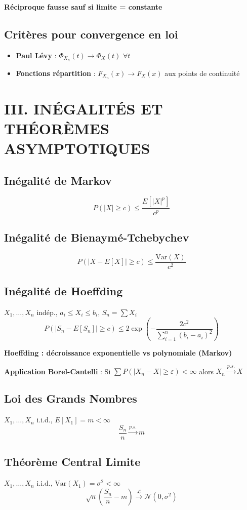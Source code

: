 \documentclass[8pt,twocolumn]{article}
\newcommand{\mydef}[1]{\textcolor{defcolor}{\textbf{#1}}}
\newcommand{\mythm}[1]{\textcolor{thmcolor}{\textbf{#1}}}
\newcommand{\myprop}[1]{\textcolor{propcolor}{\textbf{#1}}}
\newcommand{\myrem}[1]{\textcolor{remcolor}{\textbf{#1}}}
\begin{document}
\myrem{Réciproque fausse sauf si limite = constante}

\subsection{\myprop{Critères pour convergence en loi}}
\begin{itemize}[nosep]
\item \textbf{Paul Lévy} : $\Phi_{X_n}(t) \to \Phi_X(t)$ $\forall t$
\item \textbf{Fonctions répartition} : $F_{X_n}(x) \to F_X(x)$ aux points de continuité
\end{itemize}

\section*{\mydef{III. INÉGALITÉS ET THÉORÈMES ASYMPTOTIQUES}}

\subsection{\mythm{Inégalité de Markov}}
$$P(|X| \geq c) \leq \frac{E[|X|^p]}{c^p}$$

\subsection{\mythm{Inégalité de Bienaymé-Tchebychev}}
$$P(|X - E[X]| \geq c) \leq \frac{\text{Var}(X)}{c^2}$$

\subsection{\mythm{Inégalité de Hoeffding}}
$X_1,\ldots,X_n$ indép., $a_i \leq X_i \leq b_i$, $S_n = \sum X_i$
$$P(|S_n - E[S_n]| \geq c) \leq 2\exp\left(-\frac{2c^2}{\sum_{i=1}^n (b_i-a_i)^2}\right)$$

\myrem{Hoeffding : décroissance exponentielle vs polynomiale (Markov)}

\textbf{Application Borel-Cantelli} : Si $\sum P(|X_n - X| \geq \varepsilon) < \infty$ alors $X_n \xrightarrow{p.s.} X$

\subsection{\mythm{Loi des Grands Nombres}}
$X_1,\ldots,X_n$ i.i.d., $E[X_1] = m < \infty$
$$\frac{S_n}{n} \xrightarrow{p.s.} m$$

\subsection{\mythm{Théorème Central Limite}}
$X_1,\ldots,X_n$ i.i.d., $\text{Var}(X_1) = \sigma^2 < \infty$
$$\sqrt{n}\left(\frac{S_n}{n} - m\right) \xrightarrow{\mathcal{L}} \mathcal{N}(0,\sigma^2)$$
\end{document}
